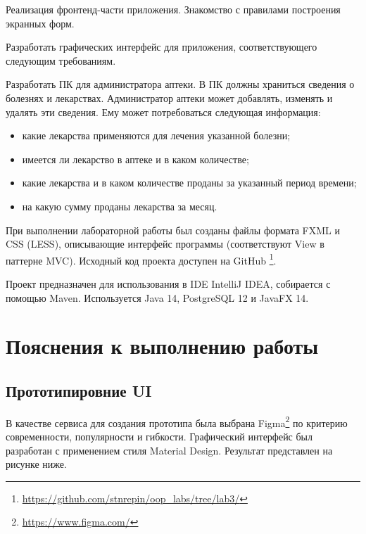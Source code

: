 \documentclass[a4paper,14pt]{extarticle}
\begin{document}


\renewcommand*{\thepage}{}
\tableofcontents
\clearpage
\renewcommand*{\thepage}{\arabic{page}}

\setcounter{page}{3}


Реализация фронтенд-части приложения. Знакомство с правилами построения
экранных форм.


Разработать графических интерфейс для приложения, соответствующего следующим
требованиям.

Разработать ПК для администратора аптеки. В ПК должны
храниться сведения о болезнях и лекарствах. Администратор аптеки может
добавлять, изменять и удалять эти сведения. Ему может потребоваться
следующая информация:
\begin{itemize}
    \item какие лекарства применяются для лечения указанной болезни;
    \item имеется ли лекарство в аптеке и в каком количестве;
    \item какие лекарства и в каком количестве проданы за указанный период
        времени;
    \item на какую сумму проданы лекарства за месяц.
\end{itemize}


При выполнении лабораторной работы был созданы файлы формата FXML и CSS (LESS),
описывающие интерфейс программы (соответствуют View в паттерне MVC). Исходный
код проекта доступен на GitHub
\footnote{\url{https://github.com/stnrepin/oop_labs/tree/lab3/}}.

Проект предназначен для использования в IDE IntelliJ IDEA, собирается с помощью
Maven. Используется Java 14, PostgreSQL 12 и JavaFX 14.

\clearpage


\section{Пояснения к выполнению работы}

\subsection{Прототипировние UI}

В качестве сервиса для создания прототипа была выбрана
Figma\footnote{\url{https://www.figma.com/}} по критерию современности,
популярности и гибкости. Графический интерфейс был разработан с применением
стиля Material Design. Результат представлен на рисунке ниже.
\end{document}
